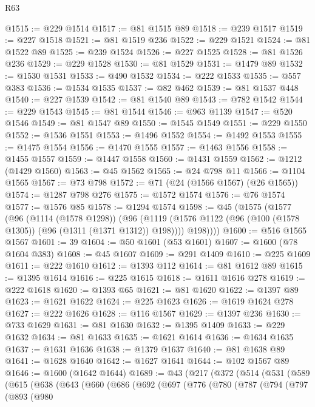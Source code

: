 \begin{lexlean}{R63}
\begin{coremodule}
@1515 := @229 @1514
@1517 := @81 @1515 @89
@1518 := @239 @1517
@1519 := @227 @1518
@1521 := @81 @1519 @236
@1522 := @229 @1521
@1524 := @81 @1522 @89
@1525 := @239 @1524
@1526 := @227 @1525
@1528 := @81 @1526 @236
@1529 := @229 @1528
@1530 := @81 @1529
@1531 := @1479 @89
@1532 := @1530 @1531
@1533 := @490 @1532
@1534 := @222 @1533
@1535 := @557 @383
@1536 := @1534 @1535
@1537 := @82 @462
@1539 := @81 @1537 @448
@1540 := @227 @1539
@1542 := @81 @1540 @89
@1543 := @782 @1542
@1544 := @229 @1543
@1545 := @81 @1544
@1546 := @963 @1139
@1547 := @520 @1546
@1549 := @81 @1547 @89
@1550 := @1545 @1549
@1551 := @229 @1550
@1552 := @1536 @1551
@1553 := @1496 @1552
@1554 := @1492 @1553
@1555 := @1475 @1554
@1556 := @1470 @1555
@1557 := @1463 @1556
@1558 := @1455 @1557
@1559 := @1447 @1558
@1560 := @1431 @1559
@1562 := @1212 (@1429 @1560)
@1563 := @45 @1562
@1565 := @24 @798 @11
@1566 := @1104 @1565
@1567 := @73 @798
@1572 := @71 (@24 (@1566 @1567) (@26 @1565))
@1574 := @1287 @798 @276
@1575 := @1572 @1574
@1576 := @76 @1574
@1577 := @1576 @85
@1578 := @1294 @1574
@1598 := @45
    (@1575
      (@1577
        (@96
          (@1114 (@1578 @1298))
          (@96
            (@1119 (@1576 @1122 (@96 (@100 (@1578 @1305)) (@96 (@1311 (@1371 @1312)) @198))))
            @198))))
@1600 := @516 @1565 @1567
@1601 := 39
@1604 := @50 @1601 (@53 @1601)
@1607 := @1600 (@78 @1604 @383)
@1608 := @45 @1607
@1609 := @291 @1409
@1610 := @225 @1609
@1611 := @222 @1610
@1612 := @1393 @112
@1614 := @81 @1612 @89
@1615 := @1395 @1614
@1616 := @225 @1615
@1618 := @1611 @1616 @278
@1619 := @222 @1618
@1620 := @1393 @65
@1621 := @81 @1620
@1622 := @1397 @89
@1623 := @1621 @1622
@1624 := @225 @1623
@1626 := @1619 @1624 @278
@1627 := @222 @1626
@1628 := @116 @1567
@1629 := @1397 @236
@1630 := @733 @1629
@1631 := @81 @1630
@1632 := @1395 @1409
@1633 := @229 @1632
@1634 := @81 @1633
@1635 := @1621 @1614
@1636 := @1634 @1635
@1637 := @1631 @1636
@1638 := @1379 @1637
@1640 := @81 @1638 @89
@1641 := @1628 @1640
@1642 := @1627 @1641
@1644 := @102 @1567 @89
@1646 := @1600 (@1642 @1644)
@1689 := @43
    (@217
      (@372
        (@514
          (@531
            (@589
              (@615
                (@638
                  (@643
                    (@660
                      (@686
                        (@692
                          (@697
                            (@776
                              (@780
                                (@787
                                  (@794
                                    (@797
                                      (@893
                                        (@980

\end{coremodule}
\end{lexlean}
